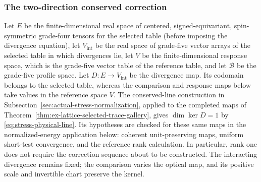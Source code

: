 \subsubsection{The two-direction conserved correction}

Let $E$ be the finite-dimensional real space of centered, signed-equivariant,
spin-symmetric grade-four tensors for the selected table (before imposing
the divergence equation), let $V_{\mathrm{int}}$ be the real space of
grade-five vector arrays of the selected table in which divergences lie,
let $V$ be the finite-dimensional response space, which is the grade-five
vector table of the reference table, and let $\mathcal B$ be the
grade-five profile space. Let
$D:E\to V_{\mathrm{int}}$ be the divergence map. Its codomain belongs to
the selected table, whereas the comparison and response maps below take
values in the reference space $V$. The conserved-line construction in
Subsection~\ref{sec:actual-stress-normalization}, applied to the completed
maps of Theorem~\ref{thm:ex-lattice-selected-trace-gallery}, gives
$\dim\ker D=1$ by \eqref{eq:stress-physical-line}. Its hypotheses
are checked for these same maps in the normalized-energy application
below: coherent unit-preserving maps, uniform short-test convergence,
and the reference rank calculation. In particular, rank one does not
require the correction sequence about to be constructed. The
interacting divergence remains fixed; the comparison varies the optical map,
and its positive scale and invertible chart preserve the kernel.

